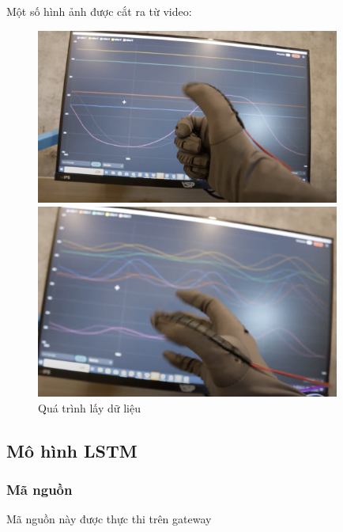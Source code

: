 \indent Một số hình ảnh được cắt ra từ video:

\begin{figure}[H]
    \centering
    \includegraphics[width=10cm]{Images/Experimental results/readdt_result_1.png}
    
    \centering
    \includegraphics[width=10cm]{Images/Experimental results/readdt_result_2.png}
\caption{Quá trình lấy dữ liệu}
\end{figure}


\subsection{Mô hình LSTM}

\subsubsection{Mã nguồn}

\indent Mã nguồn này được thực thi trên gateway


